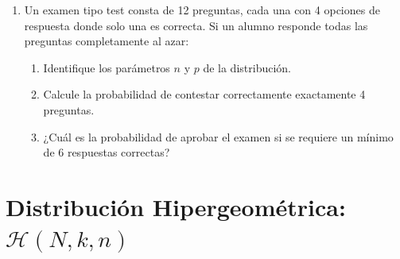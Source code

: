 \documentclass[letterpaper,12pt,spanish]{article}
\begin{document}
\begin{enumerate}[label=\arabic*.]
    \item Un examen tipo test consta de 12 preguntas, cada una con 4 opciones de respuesta donde solo una es correcta. Si un alumno responde todas las preguntas completamente al azar:
    \begin{enumerate}[label=\alph*)]
        \item Identifique los parámetros $n$ y $p$ de la distribución.
        \item Calcule la probabilidad de contestar correctamente exactamente 4 preguntas.
        \item ¿Cuál es la probabilidad de aprobar el examen si se requiere un mínimo de 6 respuestas correctas?
    \end{enumerate}
\end{enumerate}

\section{Distribución Hipergeométrica: $\mathcal{H}(N, k, n)$}
\end{document}
